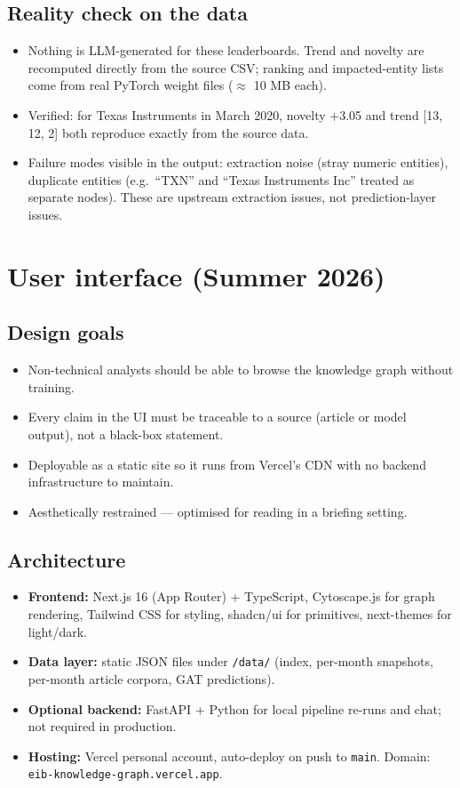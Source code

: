 \documentclass[11pt]{article}
\begin{document}
\subsection{Reality check on the data}
\begin{itemize}
  \item Nothing is LLM-generated for these leaderboards. Trend and novelty are recomputed directly from the source CSV; ranking and impacted-entity lists come from real PyTorch weight files (\(\approx\) 10 MB each).
  \item Verified: for Texas Instruments in March 2020, novelty +3.05 and trend [13, 12, 2] both reproduce exactly from the source data.
  \item Failure modes visible in the output: extraction noise (stray numeric entities), duplicate entities (e.g.\ ``TXN'' and ``Texas Instruments Inc'' treated as separate nodes). These are upstream extraction issues, not prediction-layer issues.
\end{itemize}

\section{User interface (Summer 2026)}
\label{sec:ui}

\subsection{Design goals}
\begin{itemize}
  \item Non-technical analysts should be able to browse the knowledge graph without training.
  \item Every claim in the UI must be traceable to a source (article or model output), not a black-box statement.
  \item Deployable as a static site so it runs from Vercel's CDN with no backend infrastructure to maintain.
  \item Aesthetically restrained --- optimised for reading in a briefing setting.
\end{itemize}

\subsection{Architecture}
\begin{itemize}
  \item \textbf{Frontend:} Next.js 16 (App Router) + TypeScript, Cytoscape.js for graph rendering, Tailwind CSS for styling, shadcn/ui for primitives, next-themes for light/dark.
  \item \textbf{Data layer:} static JSON files under \texttt{/data/} (index, per-month snapshots, per-month article corpora, GAT predictions).
  \item \textbf{Optional backend:} FastAPI + Python for local pipeline re-runs and chat; not required in production.
  \item \textbf{Hosting:} Vercel personal account, auto-deploy on push to \texttt{main}. Domain: \texttt{eib-knowledge-graph.vercel.app}.
\end{itemize}
\end{document}
